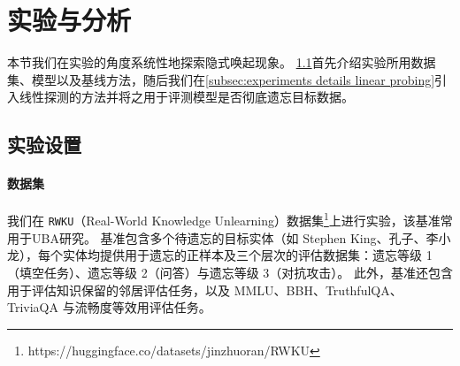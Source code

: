 
\section{实验与分析}\label{sec:experiments}

本节我们在实验的角度系统性地探索隐式唤起现象。
\cref{subsec:exp setups implementation details}首先介绍实验所用数据集、模型以及基线方法，随后我们在\cref{subsec:experiments details linear probing}引入线性探测的方法并将之用于评测模型是否彻底遗忘目标数据。

\subsection{实验设置}\label{subsec:exp setups implementation details}

\paragraph{数据集}
我们在 \texttt{RWKU}（Real-World Knowledge Unlearning）数据集\footnote{https://huggingface.co/datasets/jinzhuoran/RWKU}上进行实验，该基准常用于UBA研究。
基准包含多个待遗忘的目标实体（如 Stephen King、孔子、李小龙），每个实体均提供用于遗忘的正样本及三个层次的评估数据集：遗忘等级 1（填空任务）、遗忘等级 2（问答）与遗忘等级 3（对抗攻击）。
此外，基准还包含用于评估知识保留的邻居评估任务，以及 MMLU、BBH、TruthfulQA、TriviaQA 与流畅度等效用评估任务。

